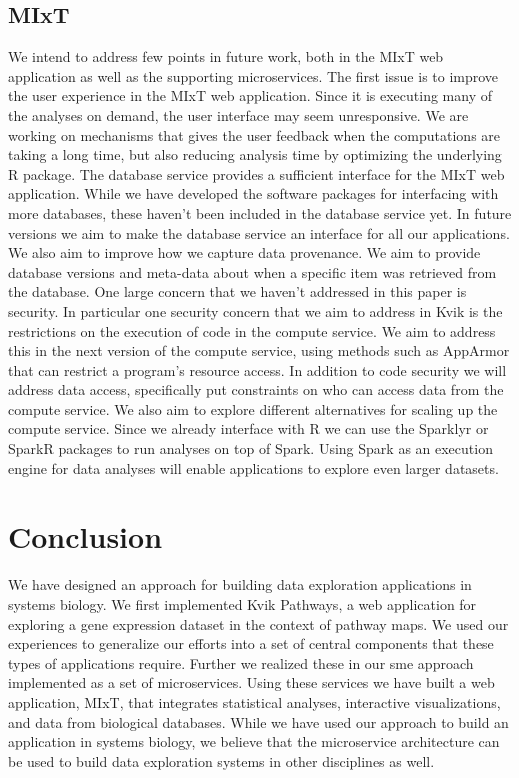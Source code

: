 \subsection{MIxT} 
We intend to address few points in future work, both in the
MIxT web application as well as the supporting microservices.  The first issue
is to improve the user experience in the MIxT web application.  Since it is
executing many of the analyses on demand, the user interface may seem
unresponsive. We are working on mechanisms that gives the user feedback when the
computations are taking a long time, but also reducing analysis time by
optimizing the underlying R package.  The database service provides a sufficient
interface for the MIxT web application. While we have developed the software
packages for interfacing with more databases, these haven't been included in the
database service yet. In future versions we aim to make the database service an
interface for all our applications.  We also aim to improve how we capture data
provenance. We aim to provide database versions and meta-data about when a
specific item was retrieved from the database.  One large concern that we
haven't addressed in this paper is security. In particular one security concern
that we aim to address in Kvik is the restrictions on the execution of code in
the compute service. We aim to address this in the next version of the compute
service, using methods such as AppArmor\cite{apparmor} that can
restrict a program's resource access. In addition to code security we will
address data access, specifically put constraints on who can access data from
the compute service.  We also aim to explore different alternatives for scaling
up the compute service.  Since we already interface with R we can use the
Sparklyr\cite{sparklyr} or SparkR\cite{sparkr} packages to run analyses on top
of Spark.\cite{zaharia2010spark} Using Spark as an execution engine for data
analyses will enable applications to explore even larger datasets.

\section{Conclusion}
We have designed an approach for building data exploration applications in
systems biology. We first implemented Kvik Pathways, a web application for
exploring a gene expression dataset in the context of pathway maps. We used our
experiences to generalize our efforts into a set of central components that
these types of applications require. Further we realized these in our \gls{sme}
approach implemented as a set of microservices.  Using these services we have
built a web application, MIxT, that integrates statistical analyses, interactive
visualizations, and data from biological databases. While we have used our
approach to build an application in systems biology, we believe that the
microservice architecture can be used to build data exploration systems in other
disciplines as well. 


